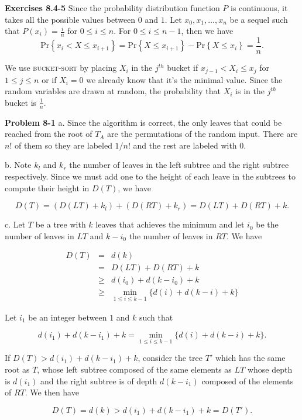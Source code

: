 \documentclass[a4paper,12pt]{article}
\newcommand{\newpar}[1]
{\bigskip \noindent \textbf{Exercises #1} \newline}
\newcommand{\newprob}[1]
{\bigskip \noindent \textbf{Problem #1} \newline}
\newcommand{\subpar}[1]{\medskip \noindent #1.}
\newcommand{\prob}[1]{\mathrm{Pr}\left\{ #1 \right\}}
\begin{document}
\newpar{8.4-5} Since the probability distribution function $P$ is
continuous, it takes all the possible values between $0$ and $1$.  Let
$x_0, x_1, \ldots, x_n$ be a sequel such that $P(x_i) = \frac{i}{n}$
for $0 \le i \le n$.  For $0 \le i \le n-1$, then we have
\[  \prob{ x_i < X \le x_{i+1}} = \prob{ X \le x_{i+1}} - \prob{ X \le
  x_i} = \frac{1}{n}.\]

We use \textsc{bucket-sort} by placing $X_i$ in the $j^{th}$ bucket if
$x_{j-1} < X_i \le x_j$ for $1\le j \le n$ or if $X_i = 0$ we already
know that it's the minimal value.  Since the random variables are
drawn at random, the probability that $X_i$ is in the $j^{th}$ bucket
is $\frac{1}{n}$.

\newprob{8-1} \subpar{a} Since the algorithm is correct, the only
leaves that could be reached from the root of $T_A$ are the
permutations of the random input.  There are $n!$ of them so they are
labeled $1/n!$ and the rest are labeled with $0$.

\subpar{b} Note $k_l$ and $k_r$ the number of leaves in the left
subtree and the right subtree respectively.  Since we must add one to
the height of each leave in the subtrees to compute their height in
$D(T)$, we have

\[ D(T) = (D(LT) + k_l) + (D(RT) + k_r) = D(LT) + D(RT) + k.\]

\subpar{c} Let $T$ be a tree with $k$ leaves that achieves the minimum
and let $i_0$ be the number of leaves in $LT$ and $k-i_0$ the number
of leaves in $RT$.  We have

\begin{eqnarray*}
  D(T) &=& d(k) \\
  &=& D(LT) + D(RT) + k \\
  &\ge& d(i_0) + d(k-i_0) + k \\
  &\ge& \min_{1\le i\le k-1}\{d(i) + d(k-i) +k\}
\end{eqnarray*}

Let $i_1$ be an integer between $1$ and $k$ such that

\[ d(i_1) + d(k-i_1) + k = \min_{1\le i\le k-1}\{d(i) + d(k-i) +k\}.\]

If $D(T) > d(i_1) + d(k-i_1) + k$, consider the tree $T'$ which has
the same root as $T$, whose left subtree composed of the same elements
as $LT$ whose depth is $d(i_1)$ and the right subtree is of depth
$d(k-i_1)$ composed of the elements of $RT$.  We then have

\[ D(T) = d(k) > d(i_1) + d(k-i_1) + k = D(T').\]
\end{document}
